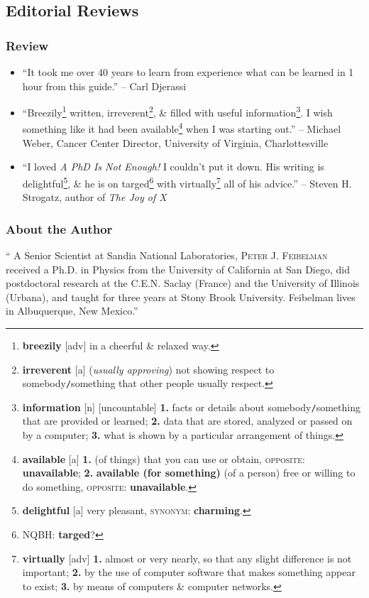 \documentclass[oneside]{book}
\numberwithin{equation}{section}
\begin{document}
\subsection*{Editorial Reviews}

\subsubsection*{Review}

\begin{itemize}
	\item ``It took me over 40 years to learn from experience what can be learned in 1 hour from this guide.'' -- Carl Djerassi
	\item ``Breezily\footnote{\textbf{breezily} [adv] in a cheerful \& relaxed way.} written, irreverent\footnote{\textbf{irreverent} [a] (\textit{usually approving}) not showing respect to somebody\texttt{/}something that other people usually respect.}, \& filled with useful information\footnote{\textbf{information} [n] [uncountable] \textbf{1.} facts or details about somebody\texttt{/}something that are provided or learned; \textbf{2.} data that are stored, analyzed or passed on by a computer; \textbf{3.} what is shown by a particular arrangement of things.}. I wish something like it had been available\footnote{\textbf{available} [a] \textbf{1.} (of things) that you can use or obtain, \textsc{opposite}: \textbf{unavailable}; \textbf{2.} \textbf{available (for something)} (of a person) free or willing to do something, \textsc{opposite}: \textbf{unavailable}.} when I was starting out.'' -- Michael Weber, Cancer Center Director, University of Virginia, Charlottesville
	\item ``I loved \textit{A PhD Is Not Enough!} I couldn't put it down. His writing is delightful\footnote{\textbf{delightful} [a] very pleasant, \textsc{synonym}: \textbf{charming}.}, \& he is on targed\footnote{NQBH: \textbf{targed}?} with virtually\footnote{\textbf{virtually} [adv] \textbf{1.} almost or very nearly, so that any slight difference is not important; \textbf{2.} by the use of computer software that makes something appear to exist; \textbf{3.} by means of computers \& computer networks.} all of his advice.'' -- Steven H. Strogatz, author of \textit{The Joy of X}
\end{itemize}

\subsubsection*{About the Author}
`` A Senior Scientist at Sandia National Laboratories, \textsc{Peter J. Feibelman} received a Ph.D. in Physics from the University of California at San Diego, did postdoctoral research at the C.E.N. Saclay (France) and the University of Illinois (Urbana), and taught for three years at Stony Brook University. Feibelman lives in Albuquerque, New Mexico.''
\end{document}
